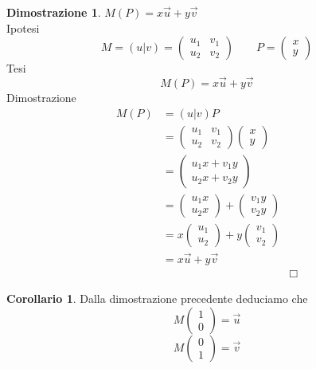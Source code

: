 \documentclass[10pt,a4paper]{article}
\theoremstyle{plain}
\theoremstyle{definition}
\newtheorem{dimostrazione}{Dimostrazione}
\newtheorem{corollario}{Corollario}
\begin{document}
	\begin{dimostrazione}$M(P)=x\vec{u}  + y \vec{v}$\\
		Ipotesi
		\[
		M=(u|v)=
		\begin{pmatrix}
		u_1 & v_1 \\
		u_2 & v_2
		\end{pmatrix}
		\qquad 
		P=\begin{pmatrix}
			x \\
			y
		\end{pmatrix}
		\]
		Tesi
		\[
		M(P)=x\vec{u}  + y \vec{v}
		\]
		Dimostrazione
		\begin{align*}
			M(P)&=(u|v)P \\
			&=\begin{pmatrix}
			u_1 & v_1 \\
			u_2 & v_2
			\end{pmatrix}
			\begin{pmatrix}
			x \\
			y
			\end{pmatrix}
			\\
			&=\begin{pmatrix}
			u_1x + v_1y \\
			u_2x + v_2y
			\end{pmatrix}
			\\
			&=\begin{pmatrix}
			u_1x \\
			u_2x
			\end{pmatrix}
			+
			\begin{pmatrix}
			v_1y \\
			v_2y
			\end{pmatrix}
			\\
			&=x\begin{pmatrix}
			u_1 \\
			u_2
			\end{pmatrix}
			+
			y\begin{pmatrix}
			v_1 \\
			v_2
			\end{pmatrix}
			\\
			&=x\vec{u}  + y \vec{v}
			\\
			&&\Box
		\end{align*}
	\end{dimostrazione}
	\begin{corollario}Dalla dimostrazione precedente deduciamo che
		\[
		M\begin{pmatrix}
		1 \\
		0
		\end{pmatrix}
		= \vec{u}
		\]
		\[
		M\begin{pmatrix}
		0 \\
		1
		\end{pmatrix}
		= \vec{v}
		\]
	\end{corollario}
\end{document}
